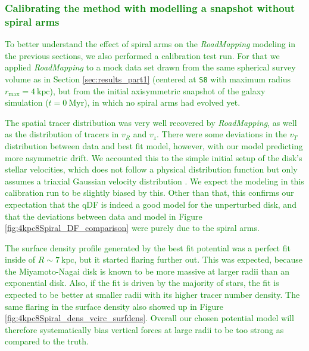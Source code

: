\documentclass[iop,revtex4,numberedappendix,appendixfloats]{emulateapj}
\newcommand{\RM}{{\sl RoadMapping}}
\newcommand{\NEW}[1]{\textcolor{Green}{#1}}
\newcommand{\hiddenComment}[1]{}
\begin{document}
\hiddenComment{[TO DO: Jo writes: "If you make the equivalent of Figure 7 for fits that are especially good and those that are especially bad, is the difference between the qDF prediction and the data that went into the analysis very different? If so, that might be nice to point out and then say that we will investigate this in later work." $\longrightarrow$ I should do this as part of the review process.]}

\subsubsection{\NEW{Calibrating the method with modelling a snapshot without spiral arms}} \label{sec:MNdHHinit}

\NEW{To better understand the effect of spiral arms on the \RM{} modeling in the previous sections, we also performed a calibration test run. For that we applied \RM{} to a mock data set drawn from the same spherical survey volume as in Section \ref{sec:results_part1} (centered at \texttt{S8} with maximum radius $r_\text{max}=4~\text{kpc}$), but from the initial axisymmetric snapshot of the galaxy simulation ($t=0~\text{Myr}$), in which no spiral arms had evolved yet.}

\NEW{The spatial tracer distribution was very well recovered by \RM{}, as well as the distribution of tracers in $v_R$ and $v_z$. There were some deviations in the $v_T$ distribution between data and best fit model, however, with our model predicting more asymmetric drift. We accounted this to the simple initial setup of the disk's stellar velocities, which does not follow a physical distribution function but only assumes a triaxial Gaussian velocity distribution \citep{2005MNRAS.361..776S}. We expect the modeling in this calibration run to be slightly biased by this. Other than that, this confirms our expectation that the qDF is indeed a good model for the unperturbed disk, and that the deviations between data and model in Figure \ref{fig:4kpc8Spiral_DF_comparison} were purely due to the spiral arms.}

\NEW{The surface density profile generated by the best fit potential was a perfect fit inside of $R\sim7~\text{kpc}$, but it started flaring further out. This was expected, because the Miyamoto-Nagai disk is known to be more massive at larger radii than an exponential disk. Also, if the fit is driven by the majority of stars, the fit is expected to be better at smaller radii with its higher tracer number density. The same flaring in the surface density also showed up in Figure \ref{fig:4kpc8Spiral_dens_vcirc_surfdens}. Overall our chosen potential model will therefore systematically bias vertical forces at large radii to be too strong as compared to the truth.}
\end{document}
